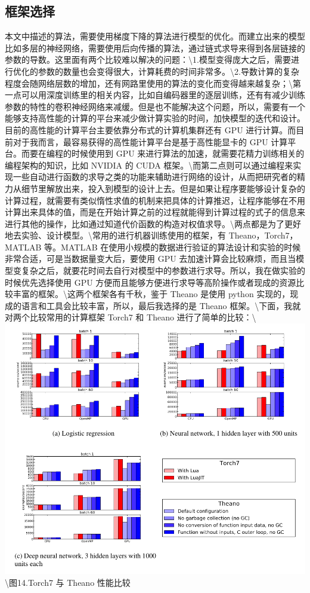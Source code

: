 \subsection{框架选择}\label{ux6846ux67b6ux9009ux62e9}

本文中描述的算法，需要使用梯度下降的算法进行模型的优化。而建立出来的模型比如多层的神经网络，需要使用后向传播的算法，通过链式求导来得到各层链接的参数的导数。这里面有两个比较难以解决的问题：\textbackslash{}1.模型变得庞大之后，需要进行优化的参数的数量也会变得很大，计算耗费的时间非常多。\textbackslash{}2.导数计算的复杂程度会随网络层数的增加，还有网路里使用的算法的变化而变得越来越复杂；\textbackslash{}第一点可以用深度训练里的相关内容，比如自编码器里的逐层训练，还有有减少训练参数的特性的卷积神经网络来减缓。但是也不能解决这个问题，所以，需要有一个能够支持高性能的计算的平台来减少做计算实验的时间，加快模型的迭代和设计。目前的高性能的计算平台主要依靠分布式的计算机集群还有
GPU
进行计算。而目前对于我而言，最容易获得的高性能计算平台是基于高性能显卡的
GPU 计算平台。而要在编程的时候使用到 GPU
来进行算法的加速，就需要花精力训练相关的编程架构的知识，比如 NVIDIA 的
CUDA
框架。\textbackslash{}而第二点则可以通过编程来实现一些自动进行函数的求导之类的功能来辅助进行网络的设计，从而把研究者的精力从细节里解放出来，投入到模型的设计上去。但是如果让程序要能够设计复杂的计算过程，就需要有类似惰性求值的机制来把具体的计算推迟，让程序能够在不用计算出来具体的值，而是在开始计算之前的过程就能得到计算过程的式子的信息来进行其他的操作，比如通过知道代价函数的构造对权值求导。\textbackslash{}两点都是为了更好地去实验、设计模型。\textbackslash{}常用的进行机器训练使用的框架，有
Theano，Torch7，MATLAB 等。MATLAB
在使用小规模的数据进行验证的算法设计和实验的时候非常合适，可是当数据量变大后，要使用
GPU
去加速计算会比较麻烦，而且当模型变复杂之后，就要花时间去自行对模型中的参数进行求导。所以，我在做实验的时候优先选择使用
GPU
方便而且能够方便进行求导等高阶操作或者现成的资源比较丰富的框架。\textbackslash{}这两个框架各有千秋，鉴于
Theano 是使用 python
实现的，现成的语言和工具会比较丰富，所以，最后我选择的是 Theano
框架。\textbackslash{}下面，我就对两个比较常用的计算框架 Torch7 和
Theano
进行了简单的比较：\textbackslash{}\includegraphics{picture/torch-vs-theano-speed.png}\textbackslash{}图14.Torch7
与 Theano 性能比较

